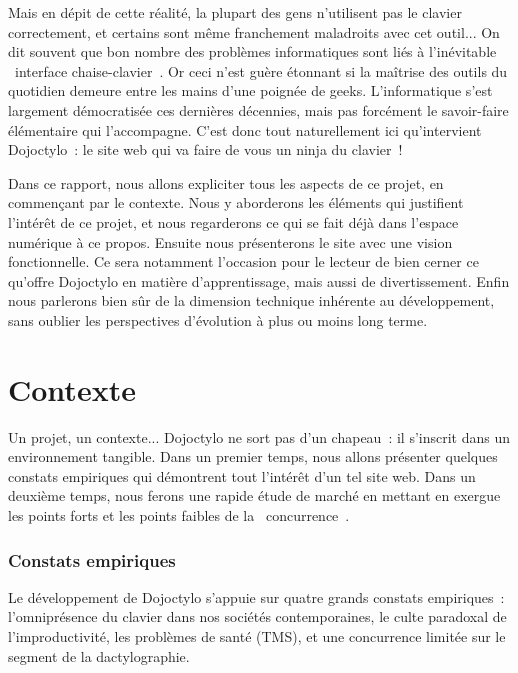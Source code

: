 \documentclass[a4paper,12pt]{article}
\begin{document}
Mais en dépit de cette réalité, la plupart des gens n'utilisent pas le clavier correctement, et certains sont même franchement maladroits avec cet outil... On dit souvent que bon nombre des problèmes informatiques sont liés à l'inévitable \og~interface chaise-clavier~\fg. Or ceci n'est guère étonnant si la maîtrise des outils du quotidien demeure entre les mains d'une poignée de geeks. L'informatique s'est largement démocratisée ces dernières décennies, mais pas forcément le savoir-faire élémentaire qui l'accompagne. C'est donc tout naturellement ici qu'intervient Dojoctylo~: le site web qui va faire de vous un ninja du clavier~!

Dans ce rapport, nous allons expliciter tous les aspects de ce projet, en commençant par le contexte. Nous y aborderons les éléments qui justifient l'intérêt de ce projet, et nous regarderons ce qui se fait déjà dans l'espace numérique à ce propos. Ensuite nous présenterons le site avec une vision fonctionnelle. Ce sera notamment l'occasion pour le lecteur de bien cerner ce qu'offre Dojoctylo en matière d'apprentissage, mais aussi de divertissement. Enfin nous parlerons bien sûr de la dimension technique inhérente au développement, sans oublier les perspectives d'évolution à plus ou moins long terme.

\newpage


\part{Contexte}

Un projet, un contexte... Dojoctylo ne sort pas d'un chapeau~: il s'inscrit dans un environnement tangible. Dans un premier temps, nous allons présenter quelques constats empiriques qui démontrent tout l'intérêt d'un tel site web. Dans un deuxième temps, nous ferons une rapide étude de marché en mettant en exergue les points forts et les points faibles de la \og~concurrence~\fg.

\section{Constats empiriques}

Le développement de Dojoctylo s'appuie sur quatre grands constats empiriques~: l'omniprésence du clavier dans nos sociétés contemporaines, le culte paradoxal de l'improductivité, les problèmes de santé (TMS), et une concurrence limitée sur le segment de la dactylographie.
\end{document}
